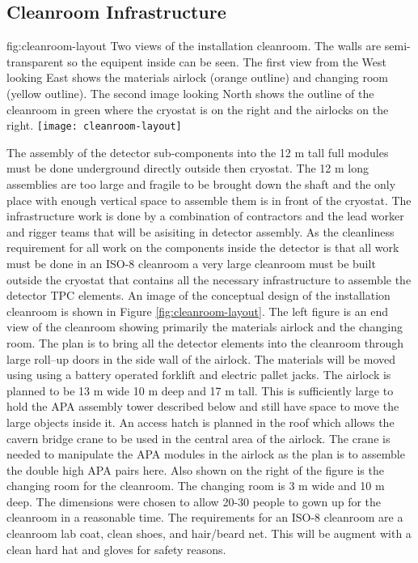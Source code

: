 \clearpage

\subsection{Cleanroom Infrastructure}
\label{sec:fdsp-tc-infr-comm}

\begin{dunefigure}{fig:cleanroom-layout}
  {Two views of the installation cleanroom. The walls are semi-transparent so the equipent inside can be seen. The first view from the West looking East shows the materials airlock (orange outline) and changing room (yellow outline). The second image looking North shows the outline of the cleanroom in green where the cryostat is on the right and the airlocks on the right.}
\texttt{[image: cleanroom-layout]}
\end{dunefigure}

The assembly of the detector sub-components into the 12 \si{m} tall full modules must be done underground directly outside then cryostat. The 12 \si{m} long assemblies are too large and fragile to be brought down the shaft and the only place with enough vertical space to assemble them is in front of the cryostat. The infrastructure work is done by a combination of contractors and the lead worker and rigger teams that will be asisiting in detector assembly. As the cleanliness requirement for all work on the components inside the detector is that all work must be done in an ISO-8 cleanroom a very large cleanroom must be built outside the cryostat that contains all the necessary infrastructure to assemble the detector TPC elements. An image of the conceptual design of the installation cleanroom is shown in Figure \ref{fig:cleanroom-layout}. The left figure is an end view of the cleanroom showing primarily the materials airlock and the changing room. The plan is to bring all the detector elements into the cleanroom through large roll--up doors in the side wall of the airlock. The materials will be moved using using  a battery operated forklift and electric pallet jacks. The airlock is planned to be  13 \si{m} wide 10 \si{m} deep and 17 \si{m} tall. This is sufficiently large to hold the APA assembly tower described below and still have space to move the large objects inside it. An access hatch is planned in the roof which allows the cavern bridge crane to be used in the central area of the airlock. The crane is needed to manipulate the APA modules in the airlock as the plan is to assemble the double high APA pairs here. Also shown on the right of the figure is the changing room for the cleanroom. The changing room is 3 \si{m} wide and 10 \si{m} deep. The dimensions were chosen to allow 20-30 people to gown up for the cleanroom in a reasonable time. The requirements for an ISO-8 cleanroom are a cleanroom lab coat, clean shoes, and hair/beard net. This will be augment with a clean hard hat and gloves for safety reasons. 

